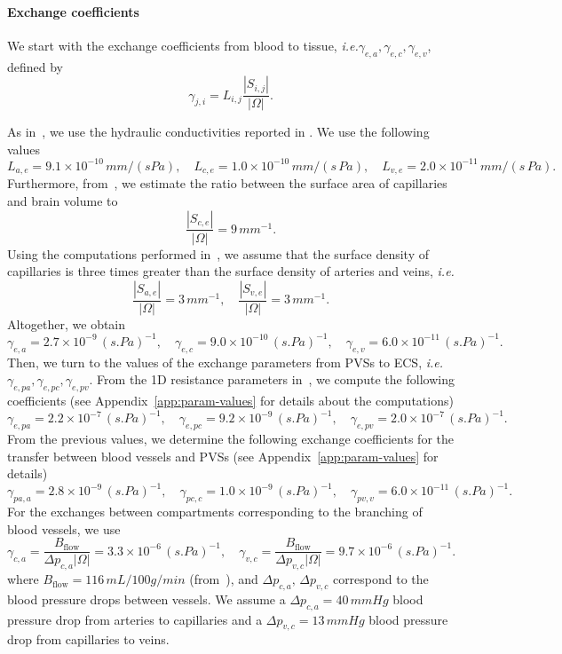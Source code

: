 \documentclass[a4paper,11pt]{article}
\newcommand{\ie}{\emph{i.e.}\;}
\newcommand{\1}{^{(1)}}
\newcommand{\2}{^{(2)}}
\newcommand{\abs}[1]{\left\lvert#1\right\rvert}
\begin{document}
\paragraph{Exchange coefficients}
\begin{sloppypar}
We start with the exchange coefficients from blood to tissue, \ie ${\gamma_{e, a}, \gamma_{e, c}, \gamma_{e, v}}$, defined by
\[
    \gamma_{j, i} = L_{i,j} \frac{\abs{S_{i,j}}}{\abs{\Omega}}. 
\]
\end{sloppypar}
As in~\cite{shi-2014-Quantification}, we use the hydraulic conductivities reported in \cite{fraser1990measurement, kimura1993measurement, roberts2009ppar}. We use the following values  
\[
    L_{a,e} = 9.1 \times 10^{-10} \,\si{mm/(s Pa)},\quad L_{c,e} = 1.0\times 10^{-10}\, \si{mm/(s\,Pa)},\quad L_{v,e} = 2.0 \times 10^{-11} \,\si{mm/(s\,Pa)}.
\]
Furthermore, from~\cite{smith2007interstitial}, we estimate the ratio between the surface area of capillaries and brain volume to 
\[
    \frac{\abs{S_{c,e}}}{\abs{\Omega}} =   9 \, \si{mm^{-1}}.
\]
Using the computations performed in~\cite{el-bouri-conferencepaper}, we assume that the surface density of capillaries is three times greater than the surface density of arteries and veins, \ie
\[
\frac{\abs{S_{a,e}}}{\abs{\Omega}} =   3 \, \si{mm^{-1}},\quad \frac{\abs{S_{v,e}}}{\abs{\Omega}} =   3 \, \si{mm^{-1}}.
\]
Altogether, we obtain 
\[
\gamma_{e , a} = 2.7 \times 10^{-9} \,\si{(s.Pa)^{-1} },\quad  \gamma_{e, c} =9.0 \times 10^{-10} \,\si{(s.Pa)^{-1} },\quad  \gamma_{e, v} = 6.0  \times 10^{-11} \,\si{(s.Pa)^{-1}}.
\]
Then, we turn to the values of the exchange parameters from PVSs to ECS, \ie $\gamma_{e, pa}, \gamma_{e, pc}, \gamma_{e, pv}$. From the 1D resistance parameters in~\cite{Vinje-2020-ICP}, we compute the following coefficients (see Appendix~\ref{app:param-values} for details about the computations) 
\[
\gamma_{e , pa} = 2.2 \times 10^{-7} \,\si{(s.Pa)^{-1} },\quad  \gamma_{e, pc} = 9.2 \times 10^{-9} \,\si{(s.Pa)^{-1} },\quad  \gamma_{e, pv} = 2.0 \times 10^{-7} \,\si{(s.Pa)^{-1} }.
\]
From the previous values, we determine the following exchange coefficients for the transfer between blood vessels and PVSs (see Appendix~\ref{app:param-values} for details)
\[ 
\gamma_{pa , a} = 2.8\times 10^{-9} \,\si{(s.Pa)^{-1} },\quad  \gamma_{pc, c} = 1.0 \times 10^{-9} \,\si{(s.Pa)^{-1} },\quad  \gamma_{pv, v} = 6.0 \times 10^{-11} \,\si{(s.Pa)^{-1} }.
\]
For the exchanges between compartments corresponding to the branching of blood vessels, we use  
\[
    \gamma_{c , a} =  \frac{B_\text{flow}}{ \Delta p_{c , a} \abs{\Omega}} = 3.3 \times 10^{-6} \,\si{(s.Pa)^{-1}}, \quad  \gamma_{v , c} =  \frac{B_\text{flow}}{\Delta p_{v , c} \abs{\Omega}} = 9.7  \times 10^{-6}\,\si{(s.Pa)^{-1}}.
\]
where $B_\text{flow} = 116 \, \si{mL/100g/min} $ (from~\cite{Larkin}), and $\Delta p_{c,a},\,\Delta p_{v , c}$ correspond to the blood pressure drops between vessels. We assume a $\Delta p_{c, a} = 40 \,\si{mmHg}$ blood pressure drop from arteries to capillaries and a $\Delta p_{v, c} = 13 \, \si{mmHg}$ blood pressure drop from capillaries to veins. 
\end{document}
